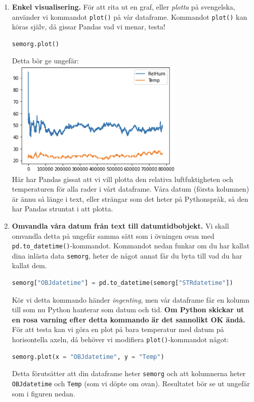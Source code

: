 \documentclass{article}
\begin{document}
\begin{enumerate}
\item \textbf{Enkel visualisering. } För att rita ut en graf, eller \emph{plotta} på svengelska, använder vi kommandot \verb+plot()+ på vår dataframe. Kommandot \verb+plot()+ kan köras själv, då gissar Pandas vad vi menar, testa!
\begin{lstlisting}[language=Python]
semorg.plot()
\end{lstlisting}
Detta bör ge ungefär:\\
\includegraphics[width=0.67\textwidth]{figures/anaconda10.png}\\
Här har Pandas gissat att vi vill plotta den relativa luftfuktigheten och temperaturen för alla rader i vårt dataframe. Våra datum (första kolumnen) är ännu så länge i text, eller strängar som det heter på Pythonspråk, så den har Pandas struntat i att plotta.
\item \textbf{Omvandla våra datum från text till datumtidbobjekt.} Vi skall omvandla detta på ungefär samma sätt som i övningen ovan med \\ \verb+pd.to_datetime()+-kommandot. Kommandot nedan funkar om du har kallat dina inlästa data \verb+semorg+, heter de något annat får du byta till vad du har kallat dem.
\begin{lstlisting}[language=Python]
semorg["OBJdatetime"] = pd.to_datetime(semorg["STRdatetime"])
\end{lstlisting}
Kör vi detta kommando händer \emph{ingenting}, men vår dataframe får en kolumn till som nu Python hanterar som datum och tid. \textbf{Om Python skickar ut en rosa varning efter detta kommando är det sannolikt OK ändå.} För att testa kan vi göra en plot på bara temperatur med datum på horisontella axeln, då behöver vi modifiera \verb+plot()+-kommandot något:
\begin{lstlisting}[language=Python]
semorg.plot(x = "OBJdatetime", y = "Temp")
\end{lstlisting}
Detta förutsätter att din dataframe heter \verb+semorg+ och att kolumnerna heter \verb+OBJdatetime+ och \verb+Temp+ (som vi döpte om ovan). Resultatet bör se ut ungefär som i figuren nedan.\\

\end{enumerate}
\end{document}
